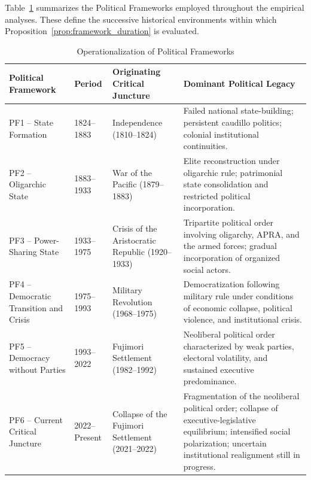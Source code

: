 \documentclass[doc, 12pt, a4paper,floatsintext]{apa7}
\begin{document}
Table~\ref{tab:frameworks} summarizes the Political Frameworks employed throughout the empirical analyses. These define the successive historical environments within which Proposition~\ref{prop:framework_duration} is evaluated.


\begin{table}[!htbp]
\centering
\caption{Operationalization of Political Frameworks}
\label{tab:frameworks}
\scriptsize
\renewcommand{\arraystretch}{1.25}
\begin{tabular}{p{3.0cm}p{1.8cm}p{4.2cm}p{5.2cm}}
\toprule
\textbf{Political Framework} &
\textbf{Period} &
\textbf{Originating Critical Juncture} &
\textbf{Dominant Political Legacy} \\
\midrule

PF1 -- State Formation &
1824--1883 &
Independence (1810--1824) &
Failed national state-building; persistent caudillo politics; colonial institutional continuities. \\

\midrule

PF2 -- Oligarchic State &
1883--1933 &
War of the Pacific (1879--1883) &
Elite reconstruction under oligarchic rule; patrimonial state consolidation and restricted political incorporation. \\

\midrule

PF3 -- Power-Sharing State &
1933--1975 &
Crisis of the Aristocratic Republic (1920--1933) &
Tripartite political order involving oligarchy, APRA, and the armed forces; gradual incorporation of organized social actors. \\

\midrule

PF4 -- Democratic Transition and Crisis &
1975--1993 &
Military Revolution (1968--1975) &
Democratization following military rule under conditions of economic collapse, political violence, and institutional crisis. \\

\midrule

PF5 -- Democracy without Parties &
1993--2022 &
Fujimori Settlement (1982--1992) &
Neoliberal political order characterized by weak parties, electoral volatility, and sustained executive predominance. \\

\midrule

PF6 -- Current Critical Juncture &
2022--Present &
Collapse of the Fujimori Settlement (2021--2022) &
Fragmentation of the neoliberal political order; collapse of executive-legislative equilibrium; intensified social polarization; uncertain institutional realignment still in progress. \\


\end{tabular}
\end{table}
\end{document}
